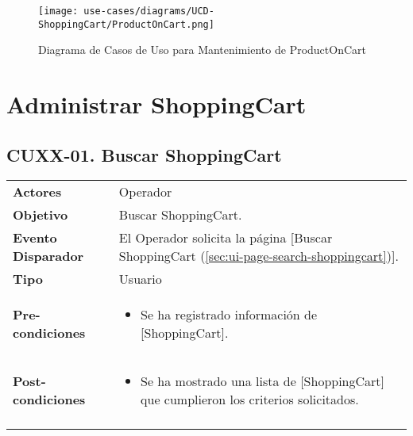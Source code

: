 	\begin{figure}[H]
		\begin{center}
		\label{tab:ucd-entity-productoncart}
		\texttt{[image: use-cases/diagrams/UCD-ShoppingCart/ProductOnCart.png]}
		\caption{Diagrama de Casos de Uso para Mantenimiento de ProductOnCart}
		\end{center}
	\end{figure}
	\clearpage
	\section{Administrar ShoppingCart} \label{sec:cf-uc-admin-shoppingcart}
	
	\subsection{CUXX-01. Buscar ShoppingCart} \label{sec:cu-search-ShoppingCart}
	
	\begin{tabular}{ p{3.5cm} p{11.5cm} }
		\textbf{Actores} & Operador\\
		\textbf{Objetivo} & Buscar ShoppingCart.\\
		\textbf{Evento Disparador} & El Operador solicita la p\'agina [Buscar ShoppingCart (\ref{sec:ui-page-search-shoppingcart})].\\
		\textbf{Tipo} & Usuario\\
		\textbf{Pre-condiciones} &
			\begin{minipage}[t]{0.6\textwidth}
			\begin{itemize}[noitemsep,nolistsep]
			\setlength{\itemindent}{-.5cm}
				\item Se ha registrado informaci\'on de [ShoppingCart].
			\end{itemize}
			\end{minipage} \\
		\textbf{Post-condiciones} &
			\begin{minipage}[t]{0.6\textwidth}
			\begin{itemize}[noitemsep,nolistsep]
			\setlength{\itemindent}{-.5cm}
				\item Se ha mostrado una lista de [ShoppingCart] que cumplieron los criterios solicitados.
			\end{itemize}
			\end{minipage} \\
		\\
	\end{tabular}
	
